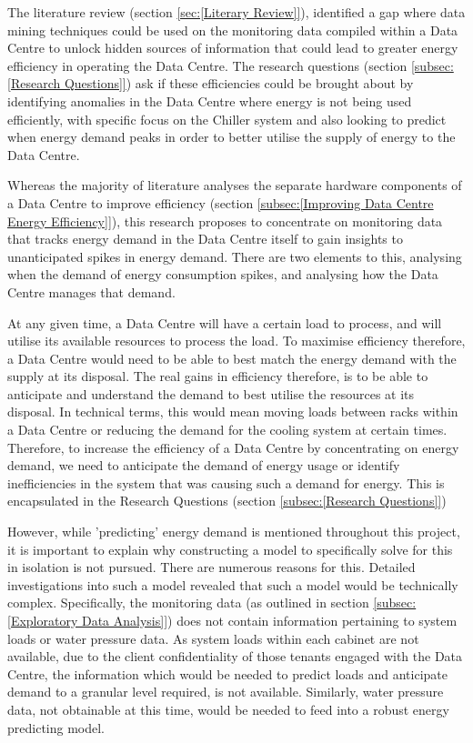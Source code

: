 \documentclass[12pt]{scrartcl}
\begin{document}
The literature review (section \ref{sec:[Literary Review]}), identified a gap where data mining techniques could be used on the monitoring data compiled within a Data Centre to unlock hidden sources of information that could lead to greater energy efficiency in operating the Data Centre. The research questions (section \ref{subsec:[Research Questions]}) ask if these efficiencies could be brought about by identifying anomalies in the Data Centre where energy is not being used efficiently, with specific focus on the Chiller system and also looking to predict when energy demand peaks in order to better utilise the supply of energy to the Data Centre.

 

Whereas the majority of literature analyses the separate hardware components of a Data Centre to improve efficiency (section \ref{subsec:[Improving Data Centre Energy Efficiency]}), this research proposes to concentrate on monitoring data that tracks energy demand in the Data Centre itself to gain insights to unanticipated spikes in energy demand. There are two elements to this, analysing when the demand of energy consumption spikes, and analysing how the Data Centre manages that demand. 

 

At any given time, a Data Centre will have a certain load to process, and will utilise its available resources to process the load. To maximise efficiency therefore, a Data Centre would need to be able to best match the energy demand with the supply at its disposal. The real gains in efficiency therefore, is to be able to anticipate and understand the demand to best utilise the resources at its disposal. In technical terms, this would mean moving loads between racks within a Data Centre or reducing the demand for the cooling system at certain times. Therefore, to increase the efficiency of a Data Centre by concentrating on energy demand, we need to anticipate the demand of energy usage or identify inefficiencies in the system that was causing such a demand for energy. This is encapsulated in the Research Questions (section \ref{subsec:[Research Questions]})

However, while 'predicting' energy demand is mentioned throughout this project, it is important to explain why constructing a model to specifically solve for this in isolation is not pursued. There are numerous reasons for this. Detailed investigations into such a model revealed that such a model would be technically complex. Specifically, the monitoring data (as outlined in section \ref{subsec:[Exploratory Data Analysis]}) does not contain information pertaining to system loads or water pressure data. As system loads within each cabinet are not available, due to the client confidentiality of those tenants engaged with the Data Centre, the information which would be needed to predict loads and anticipate demand to a granular level required, is not available. Similarly, water pressure data, not obtainable at this time, would be needed to feed into a robust energy predicting model.  
\end{document}
